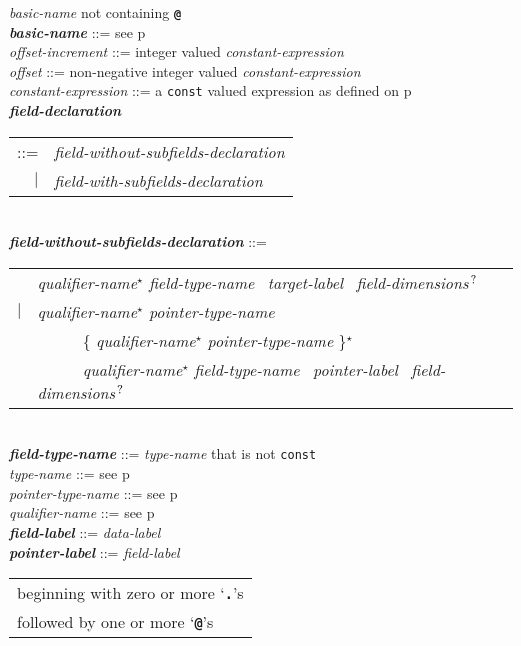 \documentclass[12pt]{article}
\newcommand{\TT}[1]{{\tt \bfseries #1}}
\newcommand{\STAR}{{\Large $^\star$}}
\newcommand{\QMARK}{{$^{\,\mbox{\footnotesize ?}}$}}
\newcommand{\emkey}[1]{{\em \bfseries #1}}
\newcommand{\pagref}[1]{p\pageref{#1}}
\newenvironment{indpar}[1][0.3in]%
	{\begin{list}{}%
		     {\setlength{\itemsep}{0in}%
		      \setlength{\topsep}{0in}%
		      \setlength{\parsep}{1ex}%
		      \setlength{\labelwidth}{#1}%
		      \setlength{\leftmargin}{#1}%
		      \addtolength{\leftmargin}{\labelsep}}%
	 \item}%
	{\end{list}}
\begin{document}
\begin{indpar}
    {\em basic-name} not containing \TT{@} \\
\emkey{basic-name} ::=  see \pagref{BASIC-NAME} \\
{\em offset-increment} ::=
    integer valued {\em constant-expression} \\
{\em offset} ::=
    non-negative integer valued {\em constant-expression} \\
{\em constant-expression} ::= a {\tt const} valued expression as
    defined on \pagref{CONSTANT-EXPRESSION}
\\[2ex]
\emkey{field-declaration}\label{FIELD-DECLARATION}
    \begin{tabular}[t]{@{}rl}
    ::= &  {\em field-without-subfields-declaration} \\
    $|$ &  {\em field-with-subfields-declaration} \\
    \end{tabular}
\\[2ex]
\emkey{field-without-subfields-declaration} ::= \\
\hspace*{0.5in}\begin{tabular}{rl}
        & {\em qualifier-name}\STAR{} {\em field-type-name}~
          {\em target-label}~ {\em field-dimensions}\QMARK{} \\
    $|$ & {\em qualifier-name}\STAR{} {\em pointer-type-name} \\
        & ~~~~~ \{ {\em qualifier-name}\STAR{} {\em pointer-type-name}
	        \}\STAR{} \\
        & ~~~~~ {\em qualifier-name}\STAR{} {\em field-type-name}~
                {\em pointer-label}~ {\em field-dimensions}\QMARK{}
	\end{tabular}
\\[2ex]
\emkey{field-type-name} ::= {\em type-name} that is not {\tt const} \\
{\em type-name} ::= see \pagref{TYPE-NAME} \\
{\em pointer-type-name} ::= see \pagref{POINTER-TYPE-NAME} \\
{\em qualifier-name} ::= see \pagref{QUALIFIER-NAME}
\\[2ex]
\emkey{field-label}\label{FIELD-LABEL} ::=  {\em data-label} \\
\emkey{pointer-label}\label{POINTER-LABEL} ::= {\em field-label}
    \begin{tabular}[t]{@{}l}
    beginning with zero or more `\TT{.}'s \\
    followed by one or more `\TT{@}'s \\

\end{tabular}
\end{indpar}
\end{document}

